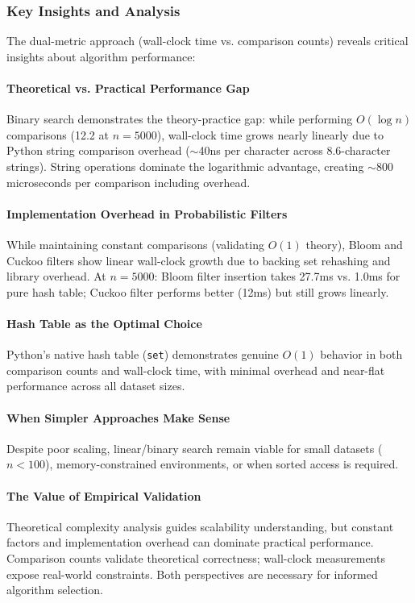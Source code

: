 \subsubsection{Key Insights and Analysis}

The dual-metric approach (wall-clock time vs. comparison counts) reveals critical insights about algorithm performance:

\paragraph{Theoretical vs. Practical Performance Gap}

Binary search demonstrates the theory-practice gap: while performing $O(\log n)$ comparisons (12.2 at $n=5000$), wall-clock time grows nearly linearly due to Python string comparison overhead ($\sim$40ns per character across 8.6-character strings). String operations dominate the logarithmic advantage, creating $\sim$800 microseconds per comparison including overhead.

\paragraph{Implementation Overhead in Probabilistic Filters}

While maintaining constant comparisons (validating $O(1)$ theory), Bloom and Cuckoo filters show linear wall-clock growth due to backing set rehashing and library overhead. At $n=5000$: Bloom filter insertion takes 27.7ms vs. 1.0ms for pure hash table; Cuckoo filter performs better (12ms) but still grows linearly.

\paragraph{Hash Table as the Optimal Choice}

Python's native hash table (\texttt{set}) demonstrates genuine $O(1)$ behavior in both comparison counts and wall-clock time, with minimal overhead and near-flat performance across all dataset sizes.

\paragraph{When Simpler Approaches Make Sense}

Despite poor scaling, linear/binary search remain viable for small datasets ($n < 100$), memory-constrained environments, or when sorted access is required.

\paragraph{The Value of Empirical Validation}

Theoretical complexity analysis guides scalability understanding, but constant factors and implementation overhead can dominate practical performance. Comparison counts validate theoretical correctness; wall-clock measurements expose real-world constraints. Both perspectives are necessary for informed algorithm selection.
